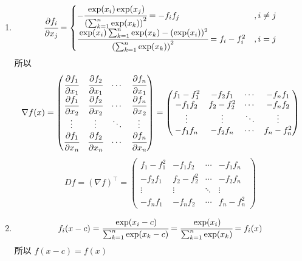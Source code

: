 \documentclass[11pt,letter,notitlepage]{article}
\begin{document}
\begin{solution}
	\begin{enumerate}
		\item $$\cfrac{\partial f_i}{\partial x_j} = \begin{cases}
				      -\cfrac{\exp(x_i)\exp(x_j)}{\left( \sum_{k=1}^{n}{\exp(x_k)} \right)^2}
				      = -f_i f_j
				       & , i \neq j \\
				      \cfrac{\exp(x_i)\sum_{k=1}^{n}{\exp(x_k)} - (\exp(x_i))^2}{\left( \sum_{k=1}^{n}{\exp(x_k)} \right)^2}
				      =f_i - f_i^2
				       & , i = j
			      \end{cases}$$
		      所以
		      $$ \nabla f(x)
			      = \begin{pmatrix}
				      \cfrac{\partial f_1}{\partial x_1} & \cfrac{\partial f_2}{\partial x_1} & \cdots & \cfrac{\partial f_n}{\partial x_1} \\
				      \cfrac{\partial f_1}{\partial x_2} & \cfrac{\partial f_2}{\partial x_2} & \cdots & \cfrac{\partial f_n}{\partial x_2} \\
				      \vdots                             & \vdots                             & \ddots & \vdots                             \\
				      \cfrac{\partial f_1}{\partial x_n} & \cfrac{\partial f_2}{\partial x_n} & \cdots & \cfrac{\partial f_n}{\partial x_n}
			      \end{pmatrix}= \begin{pmatrix}
				      f_1-f_1^2 & -f_2 f_1  & \cdots & -f_n f_1  \\
				      -f_1 f_2  & f_2-f_2^2 & \cdots & -f_n f_2  \\
				      \vdots    & \vdots    & \ddots & \vdots    \\
				      -f_1 f_n  & -f_2 f_n  & \cdots & f_n-f_n^2
			      \end{pmatrix}$$
		      $$D f= (\nabla f)^\top=\begin{pmatrix}
				      f_1-f_1^2 & -f_1 f_2  & \cdots & -f_1 f_n  \\
				      -f_2 f_1  & f_2-f_2^2 & \cdots & -f_2 f_n  \\
				      \vdots    & \vdots    & \ddots & \vdots    \\
				      -f_n f_1  & -f_n f_2  & \cdots & f_n-f_n^2
			      \end{pmatrix}$$
		\item $$f_i(x-c)=\cfrac{\exp(x_i-c)}{\sum_{k=1}^{n}{\exp(x_k-c)}}=\cfrac{\exp(x_i)}{\sum_{k=1}^{n}{\exp(x_k)}}=f_i(x)$$
		      所以 $f(x-c)=f(x)$


\end{enumerate}
\end{solution}
\end{document}
